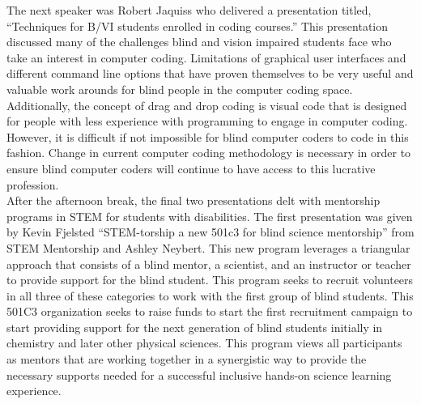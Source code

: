 \documentclass[11pt]{sig-alternate}
\begin{document}
\begin{large}
The next speaker was Robert Jaquiss who delivered a presentation titled, “Techniques for B/VI students enrolled in coding courses.” This presentation discussed many of the challenges blind and vision impaired students face who take an interest in computer coding. Limitations of graphical user interfaces and different command line options that have proven themselves to be very useful and valuable work arounds for blind people in the computer coding space. Additionally, the concept of drag and drop coding is visual code that is designed for people with less experience with programming to engage in computer coding. However, it is difficult if not impossible for blind computer coders to code in this fashion. Change in current computer coding methodology is necessary in order to ensure blind computer coders will continue to have access to this lucrative profession.\\

After the afternoon break, the final two presentations delt with mentorship programs in STEM for students with disabilities. The first presentation was given by Kevin Fjelsted “STEM-torship a new 501c3 for blind science mentorship” from STEM Mentorship and Ashley Neybert. This new program leverages a triangular approach that consists of a blind mentor, a scientist, and an instructor or teacher to provide support for the blind student. This program seeks to recruit volunteers in all three of these categories to work with the first group of blind students. This 501C3 organization seeks to raise funds to start the first recruitment campaign to start providing support for the next generation of blind students initially in chemistry and later other physical sciences. This program views all participants as mentors that are working together in a synergistic way to provide the necessary supports needed for a successful inclusive hands-on science learning experience.\\


\end{large}
\end{document}
